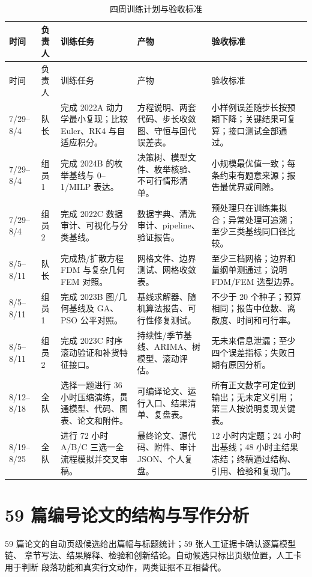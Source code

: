 \documentclass[UTF8,a4paper,12pt]{ctexart}
\begin{document}
\begin{longtable}{p{1.4cm}p{1.55cm}p{3.1cm}p{4.6cm}p{3.4cm}}
\caption{四周训练计划与验收标准}\label{tab:four-weeks}\\
\toprule
时间 & 负责人 & 训练任务 & 产物 & 验收标准\\
\midrule
\endfirsthead
\toprule
时间 & 负责人 & 训练任务 & 产物 & 验收标准\\
\midrule
\endhead
7/29--8/4 & 队长 & 完成 2022A 动力学最小复现；比较 Euler、RK4 与自适应积分。 & 方程说明、两套代码、步长收敛图、守恒与回代误差表。 & 小样例误差随步长按预期下降；关键结果可复算；接口测试全部通过。\\
7/29--8/4 & 组员1 & 完成 2024B 的枚举基线与 0--1/MILP 表达。 & 决策树、模型文件、枚举核验、不可行情形清单。 & 小规模最优值一致；每条约束有题意来源；报告最优界或间隙。\\
7/29--8/4 & 组员2 & 完成 2022C 数据审计、可视化与分类基线。 & 数据字典、清洗审计、pipeline、验证报告。 & 预处理只在训练集拟合；异常处理可追溯；至少三类基线同口径比较。\\
8/5--8/11 & 队长 & 完成热/扩散方程 FDM 与复杂几何 FEM 对照。 & 网格文件、边界测试、网格收敛表。 & 至少三档网格；边界和量纲单测通过；说明 FDM/FEM 选型边界。\\
8/5--8/11 & 组员1 & 完成 2023B 图/几何基线及 GA、PSO 公平对照。 & 基线求解器、随机算法报告、可行性修复测试。 & 不少于 20 个种子；预算相同；报告中位数、离散度、时间和可行率。\\
8/5--8/11 & 组员2 & 完成 2023C 时序滚动验证和补货特征接口。 & 持续性/季节基线、ARIMA、树模型、滚动评估。 & 无未来信息泄漏；至少四个误差指标；失败日期有原因分析。\\
8/12--8/18 & 全队 & 选择一题进行 36 小时压缩演练，贯通模型、代码、图表、论文和附件。 & 可编译论文、运行入口、结果清单、复盘表。 & 所有正文数字可定位到输出；无未定义引用；第三人按说明复现关键表。\\
8/19--8/25 & 全队 & 进行 72 小时 A/B/C 三选一全流程模拟并交叉审稿。 & 最终论文、源代码、附件、审计 JSON、个人复盘。 & 12 小时内定题；24 小时出基线；48 小时主结果冻结；终稿通过结构、引用、检验和复现门。\\
\bottomrule
\end{longtable}

\section{59 篇编号论文的结构与写作分析}

59 篇论文的自动页级候选给出篇幅与标题统计；59 张人工证据卡确认逐篇模型链、
章节写法、结果解释、检验和创新结论。自动候选只标出页级位置，人工卡用于判断
段落功能和真实行文动作，两类证据不互相替代。
\end{document}
